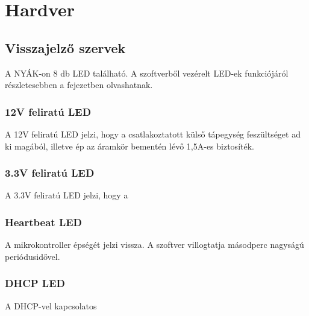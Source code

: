 \chapter{Hardver}

\section{Visszajelző szervek}
A NYÁK-on 8 db LED található.
A szoftverből vezérelt LED-ek funkciójáról részletesebben a %
fejezetben olvashatnak.

\subsection{12V feliratú LED}
A 12V feliratú LED jelzi, hogy a csatlakoztatott külső tápegység feszültséget ad ki magából, illetve ép az áramkör bementén lévő 1,5A-es biztosíték.
\subsection{3.3V feliratú LED}
A 3.3V feliratú LED jelzi, hogy a %

\subsection{Heartbeat LED}
A mikrokontroller épségét jelzi vissza. A szoftver villogtatja másodperc nagyságú periódusidővel.
\subsection{DHCP LED}
A DHCP-vel kapcsolatos 


